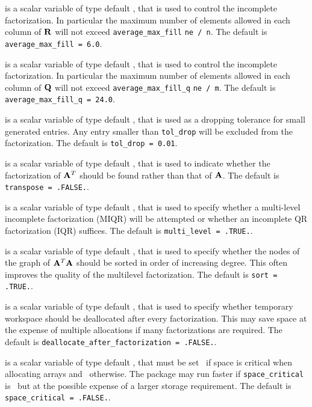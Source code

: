 \documentclass{galahad}
\begin{document}
\begin{description}
 is a scalar variable of type default \realdp, that 
is used to control the incomplete factorization. In particular
 the maximum number of elements allowed in each column of ${\mathbf{R}}$ will not exceed
{\tt average\_max\_fill} {\tt * ne / n}.
The default is {\tt average\_max\_fill = 6.0}.

 is a scalar variable of type default \realdp, that 
is used to control the incomplete factorization. In particular
 the maximum number of elements allowed in each column of ${\mathbf{Q}}$ will not exceed
{\tt average\_max\_fill\_q} {\tt * ne / m}.
The default is {\tt average\_max\_fill\_q = 24.0}.

 is a scalar variable of type default \realdp, that is used
as a dropping tolerance for small generated entries. Any entry smaller
than  {\tt tol\_drop} will be excluded from the factorization.
The default is {\tt tol\_drop = 0.01}.

 is a scalar variable of type default \logical, that is used
to indicate whether the factorization of ${\mathbf{A}}^T$ should be found rather
than that of ${\mathbf{A}}$. 
The default is {\tt transpose = .FALSE.}.

 is a scalar variable of type default \logical, that is used
to specify whether a multi-level incomplete factorization (MIQR) will be 
attempted or whether an incomplete QR factorization (IQR) suffices.
The default is {\tt multi\_level = .TRUE.}.

 is a scalar variable of type default \logical, that is used
to specify whether the nodes of the graph of ${\mathbf{A}}^T {\mathbf{A}}$ should be sorted
in order of increasing degree. This often improves the quality of the
multilevel factorization. 
The default is {\tt sort = .TRUE.}.

 is a scalar variable of type default 
\logical, that is used to specify whether temporary workspace 
should be deallocated after every factorization. This may save space
at the expense of multiple allocations if many factorizations are required.
The default is {\tt deallocate\_after\_factorization = .FALSE.}.

 is a scalar variable of type default \logical, 
that must be set \true\ if space is critical when allocating arrays
and  \false\ otherwise. The package may run faster if 
{\tt space\_critical} is \false\ but at the possible expense of a larger
storage requirement. The default is {\tt space\_critical = .FALSE.}.


\end{description}
\end{document}

